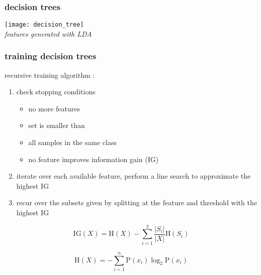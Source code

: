 \begin{frame}
  \frametitle{decision trees}
  
  	{
          \begin{center}
	  \texttt{[image: decision\_tree]}
          \\\emph{features generated with LDA}
          \end{center}
	}

\end{frame}

\begin{frame}
  \frametitle{training decision trees}
  
  recursive training algorithm \cite{wiki:c45} :
  \begin{enumerate}
  \item check stopping conditions
    \begin{itemize}
    \item no more features
    \item set is smaller than 
    \item all samples in the same class
    \item no feature improves information gain (IG)
    \end{itemize}
  \item iterate over each available feature, perform a line search to approximate the highest IG
  \item recur over the subsets given by splitting at the feature and threshold with the highest IG 
  \end{enumerate}

\begin{equation}
  \mathrm{IG}(X) = \mathrm{H}(X) - \sum_{i=1}^{2} \frac{|S_i|}{|X|} \mathrm{H}(S_i)
\end{equation}

\begin{equation}
  \mathrm{H}(X) = -\sum_{i=1}^n {\mathrm{P}(x_i) \log_2 \mathrm{P}(x_i)}
\end{equation} 
  
\end{frame}